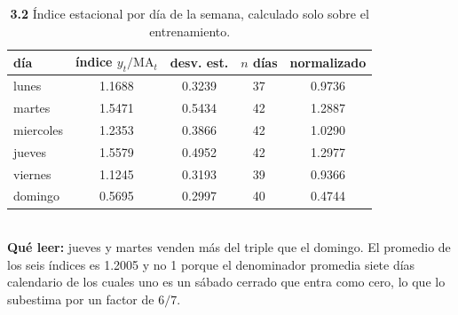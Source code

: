\begin{table}[htbp]
\centering
\footnotesize
\caption{\textbf{3.2} \'Indice estacional por d\'ia de la semana, calculado solo sobre el entrenamiento.}
\label{tab:p3_indices}
\begin{tabular}{lcccc}
\toprule
\textbf{d\'ia} & \textbf{\'indice $y_t/\mathrm{MA}_t$} & \textbf{desv. est.} & \textbf{$n$ d\'ias} & \textbf{normalizado} \\
\midrule
lunes & 1.1688 & 0.3239 & 37 & 0.9736 \\
martes & 1.5471 & 0.5434 & 42 & 1.2887 \\
miercoles & 1.2353 & 0.3866 & 42 & 1.0290 \\
jueves & 1.5579 & 0.4952 & 42 & 1.2977 \\
viernes & 1.1245 & 0.3193 & 39 & 0.9366 \\
domingo & 0.5695 & 0.2997 & 40 & 0.4744 \\
\bottomrule
\end{tabular}
\\[0.3em]{\scriptsize \textbf{Qu\'e leer:} jueves y martes venden m\'as del triple que el domingo. El promedio de los seis \'indices es 1.2005 y no 1 porque el denominador promedia siete d\'ias calendario de los cuales uno es un s\'abado cerrado que entra como cero, lo que lo subestima por un factor de $6/7$.}
\end{table}
